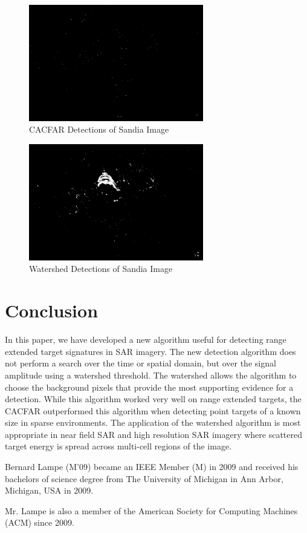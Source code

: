 \documentclass[journal]{IEEEtran}
\begin{document}
\begin{figure}[!h]
\centering
\includegraphics[width=3.0in]{../images/capitol_cfar.png}
\caption{CACFAR Detections of Sandia Image}
\label{fig:cfardetect}
\end{figure}

\begin{figure}[!h]
\centering
\includegraphics[width=3.0in]{../images/capitol_regions.png}
\caption{Watershed Detections of Sandia Image}
\label{fig:mydetect}
\end{figure}

\section{Conclusion}
In this paper, we have developed a new algorithm useful for detecting range extended target signatures in SAR imagery. The new detection algorithm does not perform a search over the time or spatial domain, but over the signal amplitude using a watershed threshold. The watershed allows the algorithm to choose the background pixels that provide the most supporting evidence for a detection. While this algorithm worked very well on range extended targets, the CACFAR outperformed this algorithm when detecting point targets of a known size in sparse environments. The application of the watershed algorithm is most appropriate in near field SAR and high resolution SAR imagery where scattered target energy is spread across multi-cell regions of the image.

\nocite{*}



\begin{IEEEbiographynophoto}{Bernard Lampe}
(M'09) became an IEEE Member (M) in 2009 and received his bachelors of science degree from The University of Michigan in Ann Arbor, Michigan, USA in 2009.
\par Mr. Lampe is also a member of the American Society for Computing Machines (ACM) since 2009.
\end{IEEEbiographynophoto}

\end{document}
